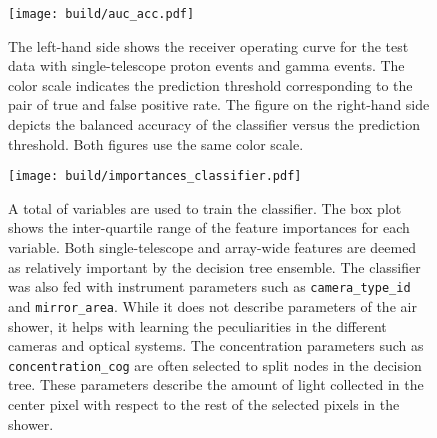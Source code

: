 \begin{figure}[]
    \centering
    \texttt{[image: build/auc\_acc.pdf]}
    \caption[ROC curve and balanced accuracy.]{The left-hand side shows the receiver operating curve for the test data with 
    \protect{} single-telescope proton events and \protect{} gamma events.
    The color scale indicates the prediction threshold corresponding to the pair of true and false positive rate. 
    The figure on the right-hand side depicts the balanced accuracy of the classifier versus the prediction threshold.
    Both figures use the same color scale.
    }
    \label{fig:roc}
\end{figure}

\begin{figure}[]
    \centering
    \texttt{[image: build/importances\_classifier.pdf]}
    \caption[Feature importance for the classifier]{A total of \protect{} variables are used to train the classifier.
    The box plot shows the inter-quartile range of the feature importances for each variable. Both single-telescope and array-wide 
    features are deemed as relatively important by the decision tree ensemble. The classifier was also fed with 
    instrument parameters such as \texttt{camera\_type\_id} and \texttt{mirror\_area}. 
    While it does not describe parameters of the air shower, it helps with learning the peculiarities in the different cameras and optical systems.
    The concentration parameters such as \texttt{concentration\_cog} are often selected to split nodes in the decision tree. These parameters
    describe the amount of light collected in the center pixel with respect to the rest of the selected pixels in the shower.
    }
    \label{fig:classifier_importance}
\end{figure}



